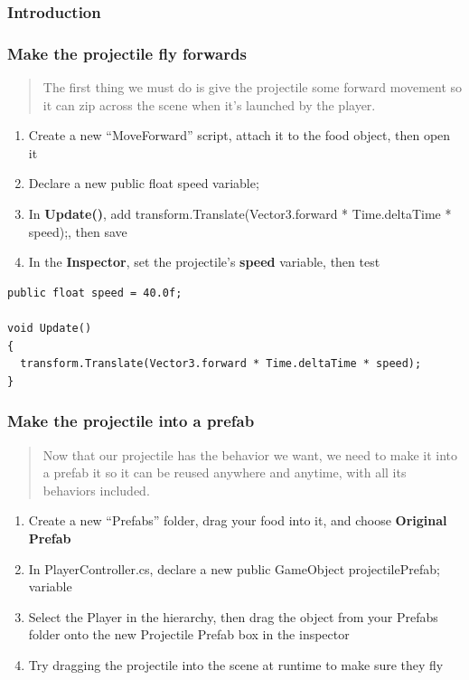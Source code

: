 \documentclass[
]{book}
\providecommand{\tightlist}{%
  \setlength{\itemsep}{0pt}\setlength{\parskip}{0pt}}
\begin{document}
\hypertarget{introduction-1}{%
\subsubsection{Introduction}\label{introduction-1}}

\hypertarget{make-the-projectile-fly-forwards}{%
\subsubsection{Make the projectile fly forwards}\label{make-the-projectile-fly-forwards}}

\begin{quote}
The first thing we must do is give the projectile some forward movement so it can zip across the scene when it's launched by the player.
\end{quote}

\begin{enumerate}
\def\labelenumi{\arabic{enumi}.}
\tightlist
\item
  Create a new ``MoveForward'' script, attach it to the food object, then open it
\item
  Declare a new public float speed variable;
\item
  In \textbf{Update()}, add transform.Translate(Vector3.forward * Time.deltaTime * speed);, then save
\item
  In the \textbf{Inspector}, set the projectile's \textbf{speed} variable, then test
\end{enumerate}

\begin{verbatim}
public float speed = 40.0f;

void Update()
{
  transform.Translate(Vector3.forward * Time.deltaTime * speed); 
}
\end{verbatim}

\hypertarget{make-the-projectile-into-a-prefab}{%
\subsubsection{Make the projectile into a prefab}\label{make-the-projectile-into-a-prefab}}

\begin{quote}
Now that our projectile has the behavior we want, we need to make it into a prefab it so it can be reused anywhere and anytime, with all its behaviors included.
\end{quote}

\begin{enumerate}
\def\labelenumi{\arabic{enumi}.}
\tightlist
\item
  Create a new ``Prefabs'' folder, drag your food into it, and choose \textbf{Original Prefab}
\item
  In PlayerController.cs, declare a new public GameObject projectilePrefab; variable
\item
  Select the Player in the hierarchy, then drag the object from your Prefabs folder onto the new Projectile Prefab box in the inspector
\item
  Try dragging the projectile into the scene at runtime to make sure they fly
\end{enumerate}
\end{document}
